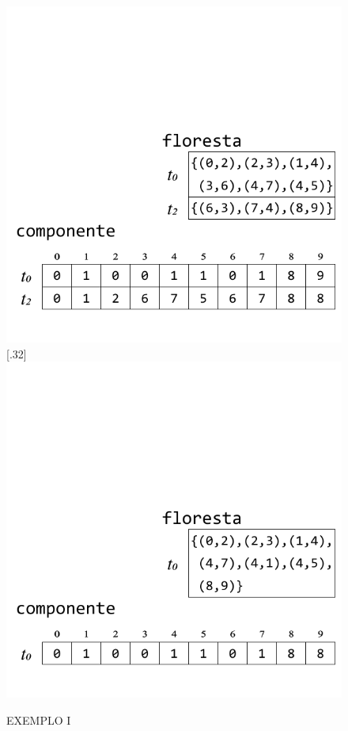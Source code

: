 \documentclass[12pt]{article}
\begin{document}
\begin{figure}[h]
{		\includegraphics[width=\linewidth]{e.pdf}
	}
	\subcaptionbox{}[.32\textwidth]
	{
		\includegraphics[width=\linewidth]{f.pdf}
	}
	\caption{EXEMPLO I}
\end{figure}



\end{document}
